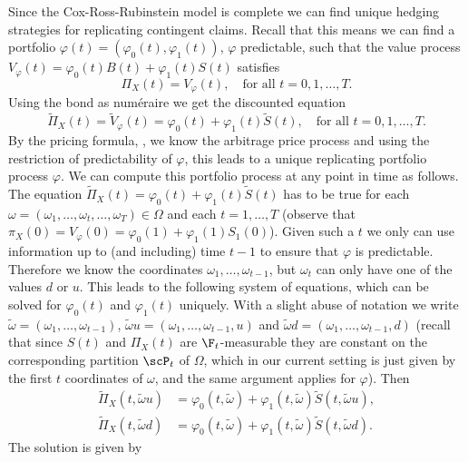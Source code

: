 Since the Cox-Ross-Rubinstein model is complete we can find unique hedging strategies for replicating contingent claims. Recall that this means we can find a portfolio \(\varphi(t) = (\varphi_0(t), \varphi_1(t))\), \(\varphi\) predictable, such that the value process \(V_\varphi(t) = \varphi_0(t)B(t) + \varphi_1(t)S(t)\) satisfies
\[
	\Pi_X(t) = V_\varphi(t), \quad \text{for all } t = 0, 1, \dots, T.
\]
Using the bond as num\'{e}raire we get the discounted equation
\[
	\tilde{\Pi}_X(t) = \tilde{V}_\varphi(t) = \varphi_0(t) + \varphi_1(t)\tilde{S}(t), \quad \text{for all } t = 0, 1, \dots, T.
\]
By the pricing formula, , we know the arbitrage price process and using the restriction of predictability of \(\varphi\), this leads to a unique replicating portfolio process \(\varphi\). We can compute this portfolio process at any point in time as follows. The equation \(\tilde{\Pi}_X(t) = \varphi_0(t) + \varphi_1(t)\tilde{S}(t)\) has to be true for each \(\omega = (\omega_1, \dots, \omega_t, \dots, \omega_T) \in \Omega\) and each \(t = 1, \dots, T\) (observe that \(\pi_X(0) = V_\varphi(0) = \varphi_0(1) + \varphi_1(1)S_1(0)\)). Given such a \(t\) we only can use information up to (and including) time \(t-1\) to ensure that \(\varphi\) is predictable. Therefore we know the coordinates \(\omega_1, \dots, \omega_{t-1}\), but \(\omega_t\) can only have one of the values \(d\) or \(u\). This leads to the following system of equations, which can be solved for \(\varphi_0(t)\) and \(\varphi_1(t)\) uniquely. With a slight abuse of notation we write \(\tilde{\omega} = (\omega_1, \dots, \omega_{t-1})\), \(\tilde{\omega}u = (\omega_1, \dots, \omega_{t-1}, u)\) and \(\tilde{\omega}d = (\omega_1, \dots, \omega_{t-1}, d)\) (recall that since \(S(t)\) and \(\Pi_X(t)\) are \(\F_t\)-measurable they are constant on the corresponding partition \(\scP_t\) of \(\Omega\), which in our current setting is just given by the first \(t\) coordinates of \(\omega\), and the same argument applies for \(\varphi\)). Then
\begin{align*}
	\tilde{\Pi}_X(t, \tilde{\omega}u) & = \varphi_0(t, \tilde{\omega}) + \varphi_1(t, \tilde{\omega})\tilde{S}(t, \tilde{\omega}u), \\
	\tilde{\Pi}_X(t, \tilde{\omega}d) & = \varphi_0(t, \tilde{\omega}) + \varphi_1(t, \tilde{\omega})\tilde{S}(t, \tilde{\omega}d).
\end{align*}
The solution is given by
